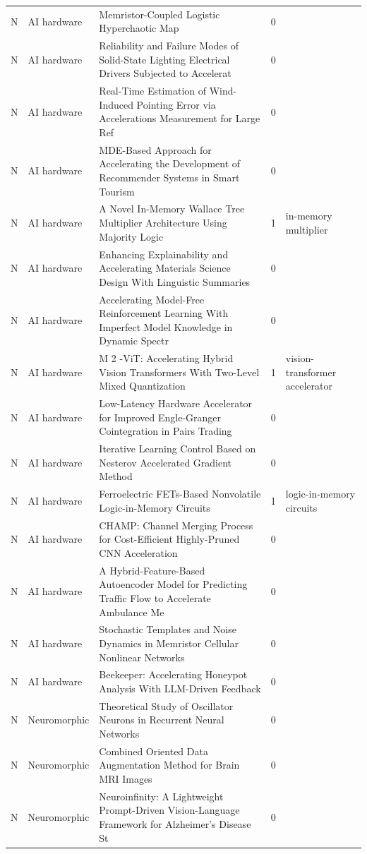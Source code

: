 \documentclass[10pt]{article}
\begin{document}
\begin{longtable}{@{}llL{8.6cm}lL{4.2cm}@{}}
N & AI hardware & Memristor-Coupled Logistic Hyperchaotic Map & 0 &  \\
N & AI hardware & Reliability and Failure Modes of Solid-State Lighting Electrical Drivers Subjected to Accelerat & 0 &  \\
N & AI hardware & Real-Time Estimation of Wind-Induced Pointing Error via Accelerations Measurement for Large Ref & 0 &  \\
N & AI hardware & MDE-Based Approach for Accelerating the Development of Recommender Systems in Smart Tourism & 0 &  \\
N & AI hardware & A Novel In-Memory Wallace Tree Multiplier Architecture Using Majority Logic & 1 & in-memory multiplier \\
N & AI hardware & Enhancing Explainability and Accelerating Materials Science Design With Linguistic Summaries & 0 &  \\
N & AI hardware & Accelerating Model-Free Reinforcement Learning With Imperfect Model Knowledge in Dynamic Spectr & 0 &  \\
N & AI hardware & M 2 -ViT: Accelerating Hybrid Vision Transformers With Two-Level Mixed Quantization & 1 & vision-transformer accelerator \\
N & AI hardware & Low-Latency Hardware Accelerator for Improved Engle-Granger Cointegration in Pairs Trading & 0 &  \\
N & AI hardware & Iterative Learning Control Based on Nesterov Accelerated Gradient Method & 0 &  \\
N & AI hardware & Ferroelectric FETs-Based Nonvolatile Logic-in-Memory Circuits & 1 & logic-in-memory circuits \\
N & AI hardware & CHAMP: Channel Merging Process for Cost-Efficient Highly-Pruned CNN Acceleration & 0 &  \\
N & AI hardware & A Hybrid-Feature-Based Autoencoder Model for Predicting Traffic Flow to Accelerate Ambulance Me & 0 &  \\
N & AI hardware & Stochastic Templates and Noise Dynamics in Memristor Cellular Nonlinear Networks & 0 &  \\
N & AI hardware & Beekeeper: Accelerating Honeypot Analysis With LLM-Driven Feedback & 0 &  \\
N & Neuromorphic & Theoretical Study of Oscillator Neurons in Recurrent Neural Networks & 0 &  \\
N & Neuromorphic & Combined Oriented Data Augmentation Method for Brain MRI Images & 0 &  \\
N & Neuromorphic & Neuroinfinity: A Lightweight Prompt-Driven Vision-Language Framework for Alzheimer’s Disease St & 0 &  \\

\end{longtable}
\end{document}
